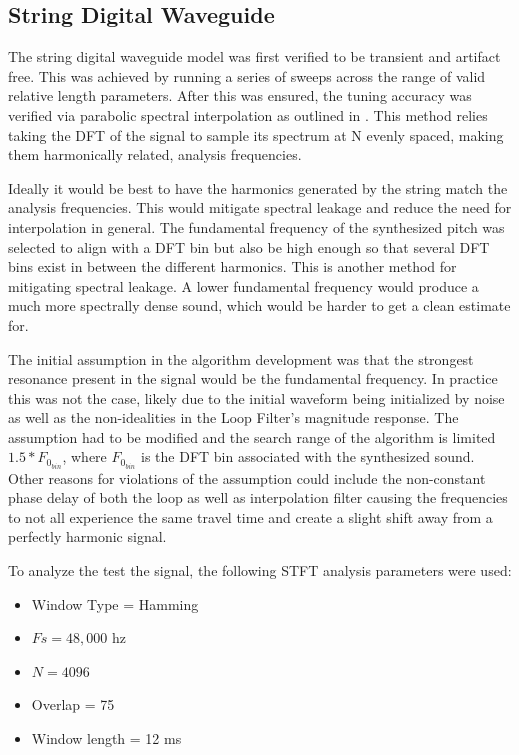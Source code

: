 \documentclass[../main.tex]{subfiles}
\begin{document}
\subsection{String Digital Waveguide}
The string digital waveguide model was first verified to be transient and artifact free. This was achieved by running a series of sweeps across the range of valid relative length parameters. After this was ensured, the tuning accuracy was verified via parabolic spectral interpolation as outlined in . This method relies taking the DFT of the signal to sample its spectrum at N evenly spaced, making them  harmonically related, analysis frequencies.

Ideally it would be best to have the harmonics generated by the string match the analysis frequencies. This would mitigate spectral leakage and reduce the need for interpolation in general. The fundamental frequency of the synthesized pitch was selected to align with a DFT bin but also be high enough so that several DFT bins exist in between the different harmonics. This is another method for mitigating spectral leakage. A lower fundamental frequency would produce a much more spectrally dense sound, which would be harder to get a clean estimate for.

The initial assumption in the algorithm development was that the strongest resonance present in the signal would be the fundamental frequency. In practice this was not the case, likely due to the initial waveform being initialized by noise as well as the non-idealities in the Loop Filter's magnitude response. The assumption had to be modified and the search range of the algorithm is limited $1.5*F_{0_{bin}}$, where $F_{0_{bin}}$ is the DFT bin associated with the synthesized sound. Other reasons for violations of the assumption could include the non-constant phase delay of both the loop as well as interpolation filter causing the frequencies to not all experience the same travel time and create a slight shift away from a perfectly harmonic signal.

To analyze the test the signal, the following STFT analysis parameters were used:
\begin{itemize}
    \item Window Type = Hamming
    \item $Fs = 48,000$ hz
    \item $N = 4096$
    \item Overlap = 75%
    \item Window length = 12 ms
\end{itemize}
\end{document}
